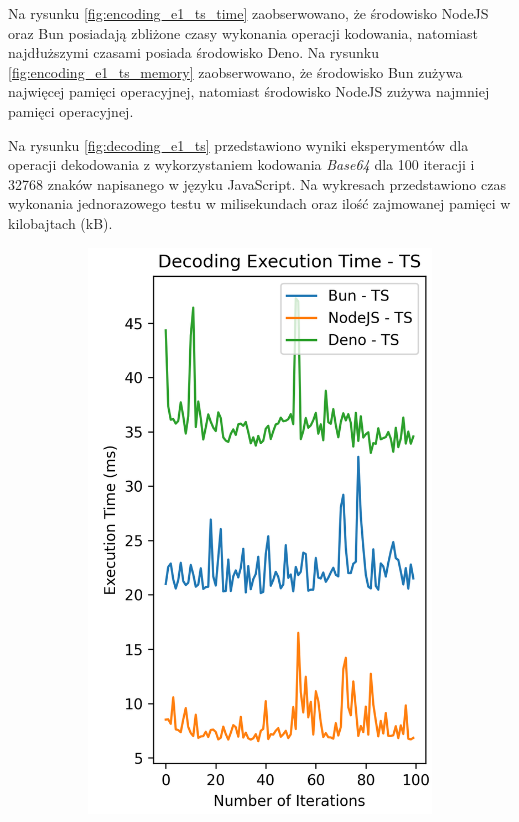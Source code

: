Na rysunku \ref{fig:encoding_e1_ts_time} zaobserwowano, że środowisko NodeJS oraz Bun posiadają zbliżone czasy wykonania operacji kodowania, natomiast najdłuższymi czasami posiada środowisko Deno. Na rysunku \ref{fig:encoding_e1_ts_memory} zaobserwowano, że środowisko Bun zużywa najwięcej pamięci operacyjnej, natomiast środowisko NodeJS zużywa najmniej pamięci operacyjnej.

Na rysunku \ref{fig:decoding_e1_ts} przedstawiono wyniki eksperymentów dla operacji dekodowania z wykorzystaniem kodowania \textit{Base64} dla 100 iteracji i 32768 znaków napisanego w języku JavaScript. Na wykresach przedstawiono czas wykonania jednorazowego testu w milisekundach oraz ilość zajmowanej pamięci w kilobajtach (kB).

\begin{figure}[H]
  \centering
  \begin{subfigure}[b]{0.44\textwidth}
    \centering
    \includegraphics[width=\textwidth]{Figures/coding/base64_100_decoding_ts_time.png}

\end{subfigure}
\end{figure}
